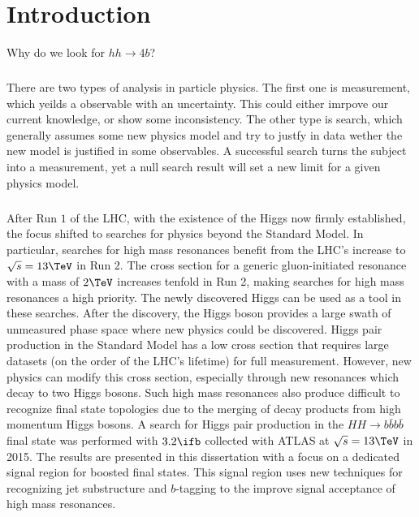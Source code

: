 \chapter{Introduction}
\label{introduction}
Why do we look for $hh\to 4b$?

\paragraph{}
There are two types of analysis in particle physics. The first one is measurement, which yeilds a observable with an uncertainty. 
This could either imrpove our current knowledge, or show some inconsistency. 
The other type is search, which generally assumes some new physics model and try to justfy in data wether the new model is justified in some observables. 
A successful search turns the subject into a measurement, yet a null search result will set a new limit for a given physics model.

\paragraph{}
After Run $1$ of the LHC, with the existence of the Higgs now firmly established, the focus shifted to searches for physics beyond the Standard Model. 
In particular, searches for high mass resonances benefit from the LHC's increase to $\sqrt{s} = 13 \TeV$ in Run 2. 
The cross section for a generic gluon-initiated resonance with a mass of $2 \TeV$ increases tenfold in Run 2, making searches for high mass resonances a high priority. 
The newly discovered Higgs can be used as a tool in these searches. 
After the discovery, the Higgs boson provides a large swath of unmeasured phase space where new physics could be discovered. 
Higgs pair production in the Standard Model has a low cross section that requires large datasets (on the order of the LHC's lifetime) for full measurement. 
However, new physics can modify this cross section, especially through new resonances which decay to two Higgs bosons. 
Such high mass resonances also produce difficult to recognize final state topologies due to the merging of decay products from high momentum Higgs bosons. 
A search for Higgs pair production in the $HH\to b\bar{b}b\bar{b}$ final state was performed with $3.2 \ifb$ collected with ATLAS at $\sqrt{s} = 13 \TeV$ in 2015. 
The results are presented in this dissertation with a focus on a dedicated signal region for boosted final states. 
This signal region uses new techniques for recognizing jet substructure and $b$-tagging to the improve signal acceptance of high mass resonances. 



